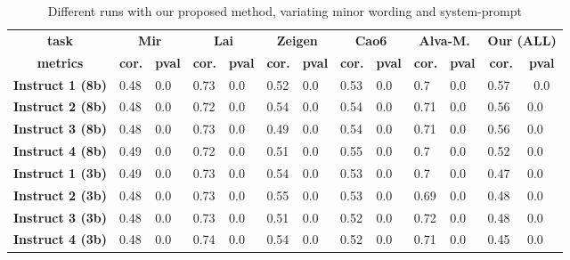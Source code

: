 \begin{table*}[]
\centering 
\begin{tabular}{@{}cllllllllllll@{}}
\toprule
\textbf{task} & \multicolumn{2}{c}{\textbf{Mir}} & \multicolumn{2}{c}{\textbf{Lai}} & \multicolumn{2}{c}{\textbf{Zeigen}} & \multicolumn{2}{c}{\textbf{Cao6}} & \multicolumn{2}{c}{\textbf{Alva-M.}} & \multicolumn{2}{l}{\textbf{Our (ALL)}} \\
\textbf{metrics} & \multicolumn{1}{c}{\textbf{cor.}} & \multicolumn{1}{c}{\textbf{pval}} & \multicolumn{1}{c}{\textbf{cor.}} & \multicolumn{1}{c}{\textbf{pval}} & \multicolumn{1}{c}{\textbf{cor.}} & \multicolumn{1}{c}{\textbf{pval}} & \multicolumn{1}{c}{\textbf{cor.}} & \multicolumn{1}{c}{\textbf{pval}} & \multicolumn{1}{c}{\textbf{cor.}} & \multicolumn{1}{c}{\textbf{pval}} & \multicolumn{1}{c}{\textbf{cor.}} & \multicolumn{1}{c}{\textbf{pval}} \\ \midrule
\textbf{Instruct 1 (8b)} & 0.48 & 0.0 & 0.73 & 0.0 & 0.52 & 0.0 & 0.53 & 0.0 & 0.7 & 0.0 & 0.57 & \multicolumn{1}{c}{0.0} \\
\textbf{Instruct 2 (8b)} & 0.48 & 0.0 & 0.72 & 0.0 & 0.54 & 0.0 & 0.54 & 0.0 & 0.71 & 0.0 & 0.56 & 0.0 \\
\textbf{Instruct 3 (8b)} & 0.48 & 0.0 & 0.73 & 0.0 & 0.49 & 0.0 & 0.54 & 0.0 & 0.71 & 0.0 & 0.56 & 0.0 \\
\textbf{Instruct 4 (8b)} & 0.49 & 0.0 & 0.72 & 0.0 & 0.51 & 0.0 & 0.55 & 0.0 & 0.7 & 0.0 & 0.52 & 0.0 \\
\textbf{Instruct 1 (3b)} & 0.49 & 0.0 & 0.73 & 0.0 & 0.54 & 0.0 & 0.53 & 0.0 & 0.7 & 0.0 & 0.47 & 0.0 \\
\textbf{Instruct 2 (3b)} & 0.48 & 0.0 & 0.73 & 0.0 & 0.55 & 0.0 & 0.53 & 0.0 & 0.69 & 0.0 & 0.48 & 0.0 \\
\textbf{Instruct 3 (3b)} & 0.48 & 0.0 & 0.73 & 0.0 & 0.51 & 0.0 & 0.52 & 0.0 & 0.72 & 0.0 & 0.48 & 0.0 \\
\textbf{Instruct 4 (3b)} & 0.48 & 0.0 & 0.74 & 0.0 & 0.54 & 0.0 & 0.52 & 0.0 & 0.71 & 0.0 & 0.45 & 0.0 \\ \bottomrule
\end{tabular}
\caption{Different runs with our proposed method, variating minor wording and system-prompt }
\label{tab:abbour}
\end{table*}